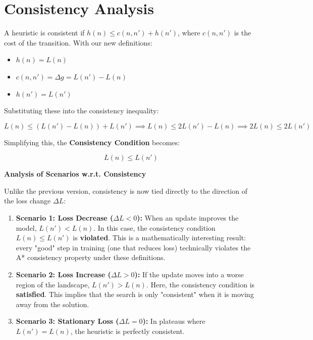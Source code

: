 \section{Consistency Analysis}
\label{sec:consistency_analysis}

A heuristic is consistent if $h(n) \le c(n, n') + h(n')$, where $c(n, n')$ is the cost of the transition. With our new definitions:
\begin{itemize}
    \item $h(n) = L(n)$
    \item $c(n, n') = \Delta g = L(n') - L(n)$
    \item $h(n') = L(n')$
\end{itemize}

Substituting these into the consistency inequality:

$$L(n) \le (L(n') - L(n)) + L(n') \implies L(n) \le 2L(n') - L(n) \implies 2L(n) \le 2L(n')$$

Simplifying this, the \textbf{Consistency Condition} becomes:

$$L(n) \le L(n')$$

\noindent \textbf{Analysis of Scenarios w.r.t. Consistency}

Unlike the previous version, consistency is now tied directly to the direction of the loss change $\Delta L$:

\begin{enumerate}
    \item \textbf{Scenario 1: Loss Decrease ($\Delta L < 0$):}
    When an update improves the model, $L(n') < L(n)$. In this case, the consistency condition $L(n) \le L(n')$ is \textbf{violated}. This is a mathematically interesting result: every "good" step in training (one that reduces loss) technically violates the A* consistency property under these definitions.
    
    \item \textbf{Scenario 2: Loss Increase ($\Delta L > 0$):}
    If the update moves into a worse region of the landscape, $L(n') > L(n)$. Here, the consistency condition is \textbf{satisfied}. This implies that the search is only "consistent" when it is moving away from the solution.
    
    \item \textbf{Scenario 3: Stationary Loss ($\Delta L = 0$):}
    In plateaus where $L(n') = L(n)$, the heuristic is perfectly consistent.
\end{enumerate}


